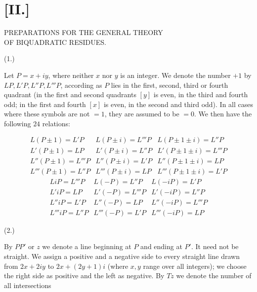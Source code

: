 
\section*{[II.]}
\begin{center}PREPARATIONS FOR THE GENERAL THEORY\\OF BIQUADRATIC RESIDUES.\end{center}
\par\medskip{}\centerline{(1.)}\smallskip
Let $P=x+iy$, where neither $x$ nor $y$ is an integer. We denote the number $+1$ by $LP,L'P,L''P,L'''P$, according as $P$ lies in the first, second, third or fourth quadrant (in the first and second quadrants $[y]$ is even, in the third and fourth odd; in the first and fourth $[x]$ is even, in the second and third odd). In all cases where these symbols are not $=1$, they are assumed to be $=0$. We then have the following $24$ relations:

\[
\begin{array}{lll}
L(P\pm1)=L'P&L(P\pm i)=L'''P&L(P\pm1\pm i)=L''P\\
L'(P\pm1)=LP&L'(P\pm i)=L''P&L'(P\pm1\pm i)=L'''P\\
L''(P\pm1)=L'''P&L''(P\pm i)=L'P&L''(P\pm1\pm i)=LP\\
L'''(P\pm1)=L''P&L'''(P\pm i)=LP&L'''(P\pm1\pm i)=L'P
\end{array}
\]
\[
\begin{array}{lll}
LiP=L'''P&L(-P)=L''P&L(-iP)=L'P\\
L'iP=LP&L'(-P)=L'''P&L'(-iP)=L''P\\
L''iP=L'P&L''(-P)=LP&L''(-iP)=L'''P\\
L'''iP=L''P&L'''(-P)=L'P&L'''(-iP)=LP
\end{array}
\]

\par\medskip{}\centerline{(2.)}\smallskip
By $PP'$ or $z$ we denote a line beginning at $P$ and ending at $P'$. It need not be straight. We assign a positive and a negative side to every straight line drawn from $2x+2iy$ to $2x+(2y+1)i$ (where $x,y$ range over all integers); we choose the right side as positive and the left as negative. By $Tz$ we denote the number of all intersections

